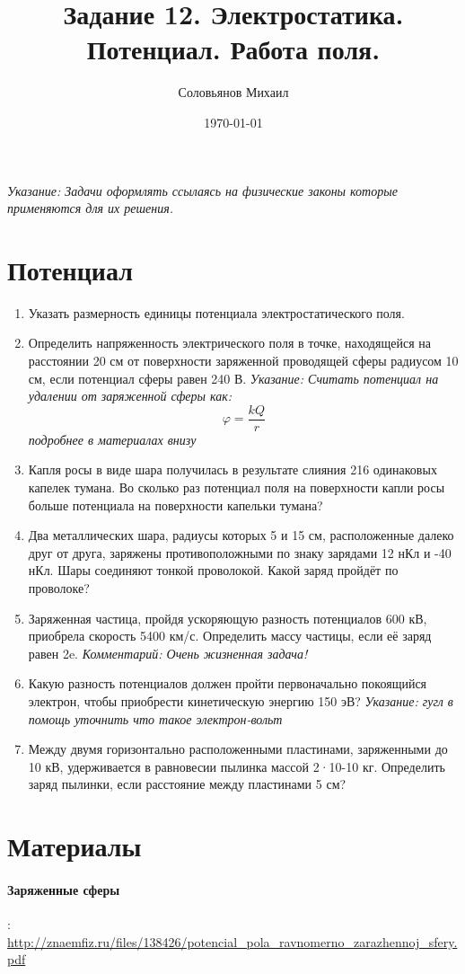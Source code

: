 \documentclass[a4paper,12pt]{article} %
\author{Соловьянов Михаил }
\title{Задание 12. Электростатика.  Потенциал. Работа поля.}
\date{\today}
\begin{document}
\maketitle



\textit{Указание: Задачи оформлять ссылаясь на физические законы которые применяются для их решения.}




\section{Потенциал}
\begin{enumerate}






	\item Указать размерность единицы потенциала электростатического поля.

	\item Определить напряженность электрического поля в точке, находящейся на расстоянии 20 см от поверхности заряженной проводящей сферы радиусом 10 см, если потенциал сферы равен 240 В.
	\textit{Указание: Считать потенциал на удалении от заряженной сферы как:}
	\begin{equation}
	\varphi = \frac{kQ}{r}
	\end{equation}
	\textit{подробнее в материалах внизу}

	\item Капля росы в виде шара получилась в результате слияния 216 одинаковых капелек тумана. Во сколько раз потенциал поля на поверхности капли росы больше потенциала на поверхности капельки тумана?

	\item Два металлических шара, радиусы которых 5 и 15 см, расположенные далеко друг от друга, заряжены противоположными по знаку зарядами 12 нКл и -40 нКл. Шары соединяют тонкой проволокой. Какой заряд пройдёт по проволоке?

	\item Заряженная частица, пройдя ускоряющую разность потенциалов 600 кВ, приобрела скорость 5400 км/с. Определить массу частицы, если её заряд равен 2e.
	\textit{Комментарий: Очень жизненная задача!}

	\item Какую разность потенциалов должен пройти первоначально покоящийся электрон, чтобы приобрести кинетическую энергию 150 эВ?
	\textit{Указание: гугл в помощь уточнить что такое электрон-вольт}


	\item Между двумя горизонтально расположенными пластинами, заряженными до 10 кВ, удерживается в равновесии пылинка массой 2·10-10 кг. Определить заряд пылинки, если расстояние между пластинами 5 см?

\end{enumerate}



\section{Материалы}

\paragraph{Заряженные сферы}: \url{http://znaemfiz.ru/files/138426/potencial_pola_ravnomerno_zarazhennoj_sfery.pdf}
\end{document}
